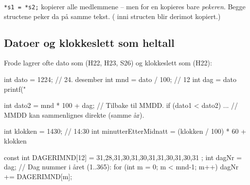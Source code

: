 \begin{tips}
\lstinline|*s1 = *s2;| kopierer alle medlemmene -- men for en  kopieres bare \emph{pekeren}.
Begge structene peker da på samme tekst. ( inni structen blir derimot kopiert.)
\end{tips}

\subsection{Datoer og klokkeslett som heltall}\label{sec:dato}
Frode lagrer ofte dato som  (H22, H23, S26) og klokkeslett som  (H22):
\begin{kode}
int dato = 1224;                        //  24. desember
int mnd  = dato / 100;                  //  12
int dag  = dato %
printf("%

int dato2 = mnd * 100 + dag;            //  Tilbake til MMDD.
if (dato1 < dato2)  ...                 //  MMDD kan sammenlignes direkte (samme år).

int klokken = 1430;                     //  14:30
int minutterEtterMidnatt = (klokken / 100) * 60 + klokken %

const int DAGERIMND[12] = { 31,28,31,30,31,30,31,31,30,31,30,31 };
int dagNr = dag;                                    //  Dag nummer i året (1..365):
for (int m = 0;  m < mnd-1;  m++)  dagNr += DAGERIMND[m];
\end{kode}

